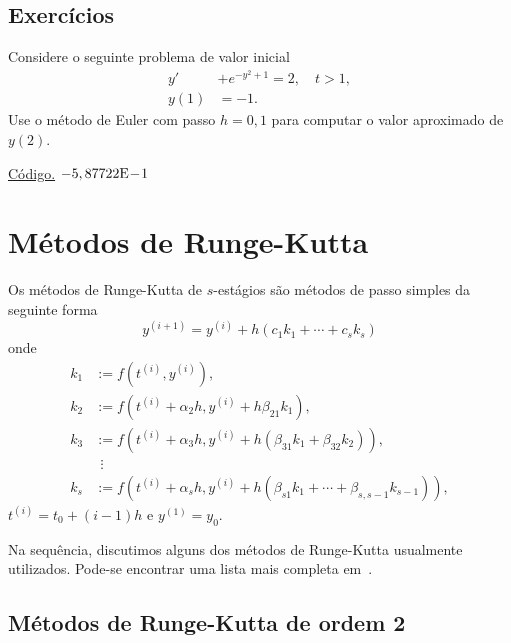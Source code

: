 \subsection*{Exercícios}

\begin{exer}
  Considere o seguinte problema de valor inicial
  \begin{align}
    y' &+ e^{-y^2+1} = 2,\quad t>1,\\
    y(1) &= -1.
  \end{align}
Use o método de Euler com passo $h=0,1$ para computar o valor aproximado de $y(2)$.
\end{exer}
\begin{resp}
  \ifisoctave 
  \href{https://github.com/phkonzen/notas/blob/master/src/MatematicaNumerica/cap_integr/dados/exer_Euler_pvi1/exer_Euler_pvi1.m}{Código.} 
  \fi
  $-5,87722\mathrm{E}\!-\!1$
\end{resp}


\section{Métodos de Runge-Kutta}\label{cap_pvi_sec_RK}

Os métodos de Runge-Kutta de $s$-estágios são métodos de passo simples da seguinte forma
\begin{equation}
  y^{(i+1)} = y^{(i)} + h(c_1k_1 + \cdots + c_sk_s)
\end{equation}
onde
\begin{align}
  k_1 &:= f(t^{(i)},y^{(i)}),\\
  k_2 &:= f(t^{(i)}+\alpha_2h,y^{(i)}+h\beta_{21}k_1),\\
  k_3 &:= f(t^{(i)}+\alpha_3h,y^{(i)}+h(\beta_{31}k_1+\beta_{32}k_2)),\\
      &~~\vdots\\
  k_s &:= f(t^{(i)}+\alpha_sh,y^{(i)}+h(\beta_{s1}k_1+\cdots+\beta_{s,s-1}k_{s-1})),
\end{align}
$t^{(i)}=t_0+(i-1)h$ e $y^{(1)}=y_0$.

Na sequência, discutimos alguns dos métodos de Runge-Kutta usualmente utilizados. Pode-se encontrar uma lista mais completa em~\cite[Cap. 8, Seç. 3.2]{Isaacson1994a}.

\subsection{Métodos de Runge-Kutta de ordem 2}

